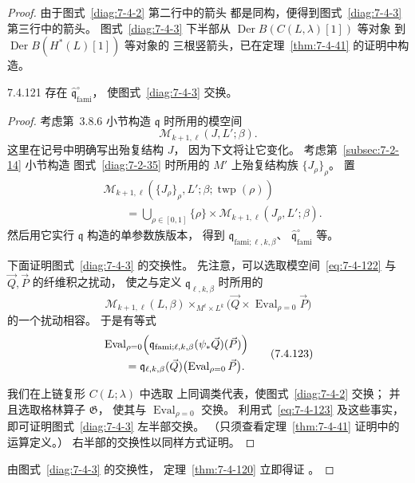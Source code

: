 \begin{proof}
由于图式~\ref{diag:7-4-2} 第二行中的箭头
都是同构，便得到图式~\ref{diag:7-4-3}
第三行中的箭头。
图式~\ref{diag:7-4-3} 下半部从
$\operatorname{Der}B(C(L,\lambda)[1])$ 等对象
到 $\operatorname{Der}B(H^*(L)[1])$ 等对象的
三根竖箭头，已在定理~\ref{thm:7-4-41}
的证明中构造。

\begin{lemma}{7.4.121}\label{lem:7-4-121}
存在 $\widehat{\mathfrak q}^{\circ}_{\mathrm{fami}}$，
使图式~\ref{diag:7-4-3} 交换。
\end{lemma}

\begin{proof}
考虑第~3.8.6 小节构造 $\mathfrak q$ 时所用的模空间
\[
\mathcal M_{k+1,\ell}(J,L';\beta).
\]
这里在记号中明确写出殆复结构 $J$，
因为下文将让它变化。
考虑第~\ref{subsec:7-2-14} 小节构造
图式~\ref{diag:7-2-35} 时所用的
$M'$ 上殆复结构族 $\{J_\rho\}_\rho$。
置
\begin{equation}
\begin{aligned}
&\mathcal M_{k+1,\ell}
(\{J_\rho\}_\rho,L';\beta;
\operatorname{twp}(\rho))\\
&\qquad=
\bigcup_{\rho\in[0,1]}
\{\rho\}\times
\mathcal M_{k+1,\ell}(J_\rho,L';\beta).
\end{aligned}
\tag{7.4.122}\label{eq:7-4-122}
\end{equation}
然后用它实行 $\mathfrak q$ 构造的单参数族版本，
得到
$\mathfrak q_{\mathrm{fami};\ell,k,\beta}$、
$\widehat{\mathfrak q}^{\circ}_{\mathrm{fami}}$ 等。

下面证明图式~\ref{diag:7-4-3} 的交换性。
先注意，可以选取模空间~\eqref{eq:7-4-122}
与 $\vec Q,\vec P$ 的纤维积之扰动，
使之与定义 $\mathfrak q_{\ell,k,\beta}$ 时所用的
\[
\mathcal M_{k+1,\ell}(L,\beta)
\mathbin{\times_{M^\ell\times L^k}}
\bigl(\vec Q\times
\operatorname{Eval}_{\rho=0}\vec P\bigr)
\]
的一个扰动相容。
于是有等式
\begin{equation}
\begin{aligned}
&\operatorname{Eval}_{\rho=0}\Bigl(
\mathfrak q_{\mathrm{fami};\ell,k,\beta}
(\psi_*\vec Q)(\vec P)\Bigr)\\
&\qquad=
\mathfrak q_{\ell,k,\beta}(\vec Q)
\bigl(\operatorname{Eval}_{\rho=0}\vec P\bigr).
\end{aligned}
\tag{7.4.123}\label{eq:7-4-123}
\end{equation}

我们在上链复形 $C(L;\lambda)$ 中选取
上同调类代表，使图式~\ref{diag:7-4-2} 交换；
并且选取格林算子 $\mathfrak G$，
使其与 $\operatorname{Eval}_{\rho=0}$ 交换。
利用式~\eqref{eq:7-4-123} 及这些事实，
即可证明图式~\ref{diag:7-4-3} 左半部交换。
（只须查看定理~\ref{thm:7-4-41}
证明中的运算定义。）
右半部的交换性以同样方式证明。
\end{proof}

由图式~\ref{diag:7-4-3} 的交换性，
定理~\ref{thm:7-4-120} 立即得证
。
\end{proof}

